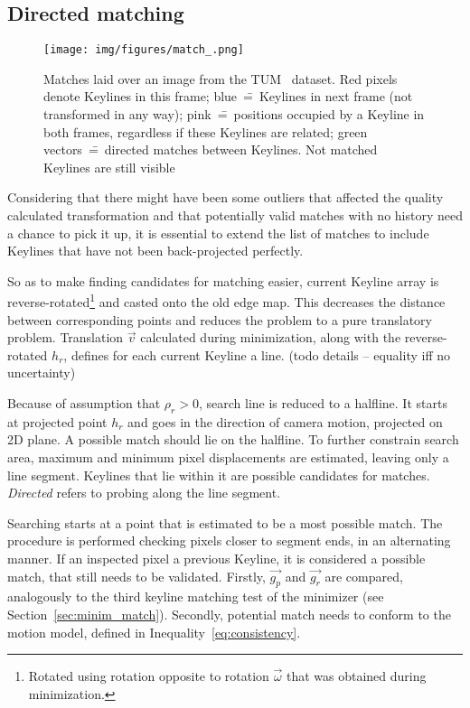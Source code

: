 \subsection{Directed matching}

\begin{figure}[ht]
	\centering\texttt{[image: img/figures/match\_.png]}
	\caption{ Matches laid over an image from the TUM~\cite{tum} dataset. Red pixels denote Keylines in this frame; blue~\==~Keylines in next frame (not transformed in any way); pink~\==~positions occupied by a Keyline in both frames, regardless if these Keylines are related; green vectors~\==~directed matches between Keylines. Not matched Keylines are still visible }
	\label{fig:match}
\end{figure}


Considering that there might have been some outliers that affected the quality calculated transformation and that potentially valid matches with no history need a chance to pick it up, it is essential to extend the list of matches to include Keylines that have not been back-projected perfectly.

So as to make finding candidates for matching easier, current Keyline array is reverse-rotated\footnote{Rotated using rotation opposite to rotation $\vec{\omega}$ that was obtained during minimization.} and casted onto the old edge map. This decreases the distance between corresponding points and reduces the problem to a pure translatory problem. Translation $\vec{v}$ calculated during minimization, along with the reverse-rotated $h_r$, defines for each current Keyline a line. (todo details -- equality iff no uncertainty)

Because of assumption that $\rho_r > 0$, search line is reduced to a halfline. It starts at projected point $h_r$ and goes in the direction of camera motion, projected on 2D plane. A possible match should lie on the halfline. To further constrain search area, maximum and minimum pixel displacements are estimated, leaving only a line segment. Keylines that lie within it are possible candidates for matches.  \textit{Directed} refers to probing along the line segment.

Searching starts at a point that is estimated to be a most possible match. The procedure is performed checking pixels closer to segment ends, in an alternating manner. If an inspected pixel a previous Keyline, it is considered a possible match, that still needs to be validated. Firstly, $\vec{g_p}$ and $\vec{g_r}$ are compared, analogously to the third keyline matching test of the minimizer (see Section~\ref{sec:minim_match}). Secondly, potential match needs to conform to the motion model, defined in Inequality~\ref{eq:consistency}.

